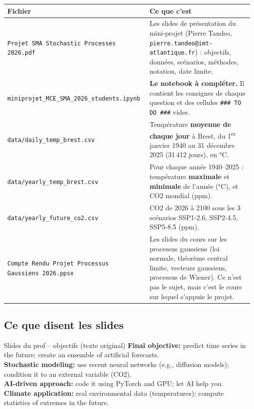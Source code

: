\documentclass[11pt,a4paper]{article}
\newcommand{\f}[1]{\texttt{#1}}
\begin{document}
\begin{tabularx}{\linewidth}{@{}lX@{}}
\toprule
\textbf{Fichier} & \textbf{Ce que c'est} \\
\midrule
\f{Projet SMA Stochastic Processes 2026.pdf} & Les slides de présentation du mini-projet (Pierre Tandeo, \f{pierre.tandeo@imt-atlantique.fr}) : objectifs, données, scénarios, méthodes, notation, date limite. \\
\f{miniprojet\_MCE\_SMA\_2026\_students.ipynb} & \textbf{Le notebook à compléter.} Il contient les consignes de chaque question et des cellules \f{\#\#\# TO DO \#\#\#} vides. \\
\f{data/daily\_temp\_brest.csv} & Température \textbf{moyenne de chaque jour} à Brest, du 1\textsuperscript{er} janvier 1940 au 31 décembre 2025 (31\,412 jours), en °C. \\
\f{data/yearly\_temp\_brest.csv} & Pour chaque année 1940--2025 : température \textbf{maximale} et \textbf{minimale} de l'année (°C), et CO2 mondial (ppm). \\
\f{data/yearly\_future\_co2.csv} & CO2 de 2026 à 2100 sous les 3 scénarios SSP1-2.6, SSP2-4.5, SSP5-8.5 (ppm). \\
\f{Compte Rendu Projet Processus Gaussiens 2026.ppsx} & Les slides du cours sur les processus gaussiens (loi normale, théorème central limite, vecteurs gaussiens, processus de Wiener). Ce n'est pas le sujet, mais c'est le cours sur lequel s'appuie le projet. \\
\bottomrule
\end{tabularx}

\subsection{Ce que disent les slides}

\begin{prof}{Slides du prof -- objectifs (texte original)}
\textbf{Final objective:} predict time series in the future; create an ensemble of artificial forecasts.\\
\textbf{Stochastic modeling:} use recent neural networks (e.g., diffusion models); condition it to an external variable (CO2).\\
\textbf{AI-driven approach:} code it using PyTorch and GPU; let AI help you.\\
\textbf{Climate application:} real environmental data (temperatures); compute statistics of extremes in the future.
\end{prof}
\end{document}
